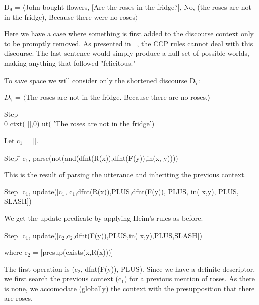 \documentclass{article}
\begin{document}
D$_9$ = $\langle$John bought flowers, [Are the roses in the fridge?], No,
(the roses are not in the fridge), Because there were no
roses$\rangle$

Here we have a case where something is first added to the discourse
context only to be promptly removed. As presented in
~\cite{heim:projection_problem}, the CCP rules cannot deal with this
discourse. The last sentence would simply produce a null set of
possible worlds, making anything that followed "felicitous."

To save space we will consider only the shortened discourse D$_7$:

$D_7$ = $\langle$The roses are not in the fridge. Because there are no
roses.$\rangle$

\begin{tabbing}
Step \= \\

0 \> ctxt( [],0) ut( 'The roses are not in the fridge')
\end{tabbing}

Let c$_1$ = [].



\begin{tabbing}
Step \= \> c$_1$, parse(not(and(dfnt(R(x)),dfnt(F(y)),in(x, y))))
\end{tabbing}

This is the result of parsing the utterance and inheriting the
previous context.

\begin{tabbing}
Step \= \> c$_1$, update([c$_1$, c$_1$,dfnt(R(x)),PLUS,dfnt(F(y)), PLUS, in( x,y), PLUS, SLASH])
\end{tabbing}

We get the update predicate by applying Heim's rules as before.

\begin{tabbing}
Step \= \> c$_1$, update([c$_2$,c$_2$,dfnt(F(y)),PLUS,in( x,y),PLUS,SLASH])
\end{tabbing}

where c$_2$ = [presup(exists(x,R(x)))]

The first operation is (c$_2$, dfnt(F(y)), PLUS).
Since we have a definite descriptor, we first search the previous
context (c$_1$) for a previous mention of roses.  As there is none, we
accomodate (globally) the context with the presupposition that there
are roses.
\end{document}
